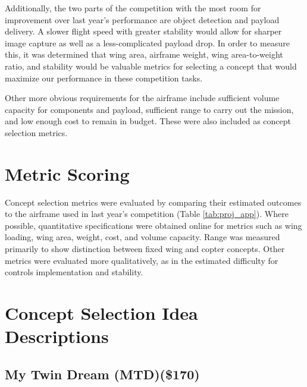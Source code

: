 \documentclass[]{auvsi_doc}
\begin{document}
Additionally, the two parts of the competition with the most room for improvement over last year's performance are object detection and payload delivery. A slower flight speed with greater stability would allow for sharper image capture as well as a less-complicated payload drop. In order to measure this, it was determined that wing area, airframe weight, wing area-to-weight ratio, and stability would be valuable metrics for selecting a concept that would maximize our performance in these competition tasks.

Other more obvious requirements for the airframe include sufficient volume capacity for components and payload, sufficient range to carry out the mission, and low enough cost to remain in budget. These were also included as concept selection metrics.

\section{Metric Scoring}

Concept selection metrics were evaluated by comparing their estimated outcomes to the airframe used in last year's competition (Table \ref{tab:proj_app}). Where possible, quantitative specifications were obtained online for metrics such as wing loading, wing area, weight, cost, and volume capacity. Range was measured primarily to show distinction between fixed wing and copter concepts. Other metrics were evaluated more qualitatively, as in the estimated difficulty for controls implementation and stability.

\section{Concept Selection Idea Descriptions}

\subsection{My Twin Dream (MTD)(\$170)}
\end{document}
